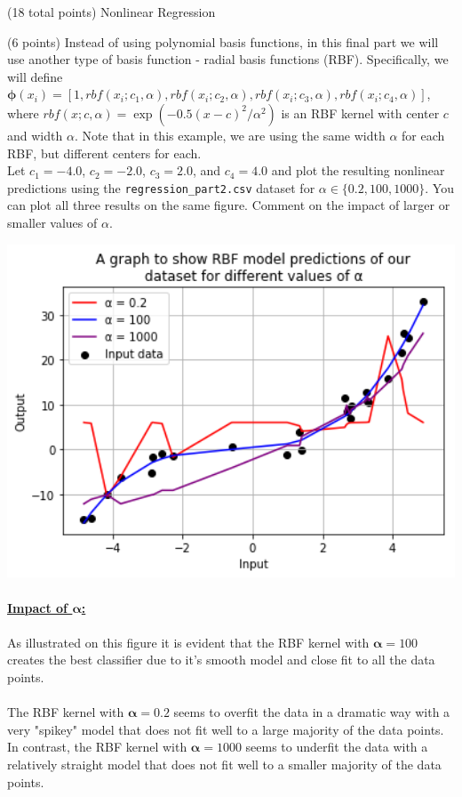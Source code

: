 \documentclass[12pt]{article}
\begin{document}
\begin{question}{(18 total points) Nonlinear Regression}
\begin{subquestion}
\end{subquestion}



%
%
\begin{subquestion}{(6 points) Instead of using polynomial basis functions, in this final part we will use another type of basis function - radial basis functions (RBF). 
Specifically, we will define $\boldsymbol{\phi}(x_i) = [1, rbf(x_i; c_1, \alpha), rbf(x_i; c_2, \alpha), rbf(x_i; c_3, \alpha), rbf(x_i; c_4, \alpha)]$, where $rbf(x; c, \alpha) =  \exp(-0.5(x-c)^2 / \alpha^2)$ is an RBF kernel with center $c$ and width $\alpha$. Note that in this example, we are using the same width $\alpha$ for each RBF, but different centers for each.\\ 
Let $c_1=-4.0$, $c_2=-2.0$, $c_3=2.0$, and $c_4=4.0$ and plot the resulting nonlinear predictions using the \texttt{regression\_part2.csv} dataset for $\alpha \in \{0.2, 100, 1000\}$. 
You can plot all three results on the same figure.
Comment on the impact of larger or smaller values of $\alpha$.
}


\begin{answerbox}{44em}
\includegraphics [width=1\textwidth]{images/q2d-graph.png}\\
\\
\large{\textbf{\underline{Impact of $\mathbf{\alpha}$:}}}\\
\\
\normalsize{
As illustrated on this figure it is evident that the RBF kernel with $\mathbf{\alpha} = 100$ creates the best classifier due to it's smooth model and close fit to all the data points.\\
\\
The RBF kernel with $\mathbf{\alpha} = 0.2$ seems to overfit the data in a dramatic way with a very "spikey" model that does not fit well to a large majority of the data points. In contrast, the RBF kernel with $\mathbf{\alpha} = 1000$ seems to underfit the data with a relatively straight model that does not fit well to a smaller majority of the data points.\\
}
\end{answerbox}




\end{subquestion}
\end{question}
\end{document}
